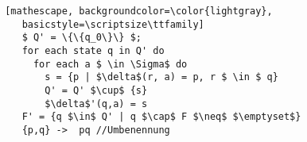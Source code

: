 \documentclass[
    border=0.2cm,
    convert={density=600}
]{standalone}
\begin{document}
\begin{lstlisting} [mathescape, backgroundcolor=\color{lightgray},
    basicstyle=\scriptsize\ttfamily]
    $ Q' = \{\{q_0\}\} $;
    for each state q in Q' do
      for each a $ \in \Sigma$ do
        s = {p | $\delta$(r, a) = p, r $ \in $ q}
        Q' = Q' $\cup$ {s}
        $\delta$'(q,a) = s
    F' = {q $\in$ Q' | q $\cap$ F $\neq$ $\emptyset$}
    {p,q} ->  pq //Umbenennung
\end{lstlisting}
\end{document}
